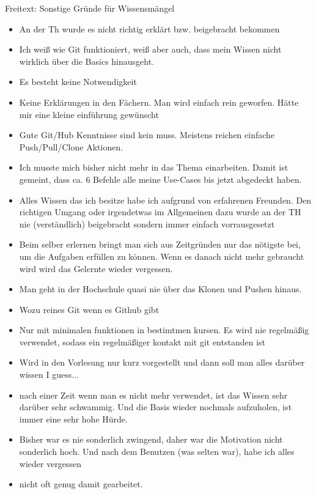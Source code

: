\documentclass[
	ngerman,
	BCOR=8mm,
	headings=normal,
	parskip=half,
	headsepline,
	automark,
	listof=totoc,
	bibliography=totoc,
]{scrreprt}
\begin{document}
Freitext: Sonstige Gründe für Wissensmängel
\begin{itemize}
    \setlength{\itemsep}{-1pt} 
    \item An der Th wurde es nicht richtig erklärt bzw. beigebracht bekommen
    \item Ich weiß wie Git funktioniert, weiß aber auch, dass mein Wissen nicht wirklich über die Basics hinausgeht.
    \item Es besteht keine Notwendigkeit
    \item Keine Erklärungen in den Fächern. Man wird einfach rein geworfen. Hätte mir eine kleine einführung gewünscht
    \item Gute Git/Hub Kenntnisse sind kein muss. Meistens reichen einfache Push/Pull/Clone Aktionen.
    \item Ich musste mich bisher nicht mehr in das Thema einarbeiten. Damit ist gemeint, dass ca. 6 Befehle alle meine Use-Cases bis jetzt abgedeckt haben.
    \item Alles Wissen das ich besitze habe ich aufgrund von erfahrenen Freunden. Den richtigen Umgang oder irgendetwas im Allgemeinen dazu wurde an der TH nie (verständlich) beigebracht sondern immer einfach vorrausgesetzt
    \item Beim selber erlernen bringt man sich aus Zeitgründen nur das nötigste bei, um die Aufgaben erfüllen zu können. Wenn es danach nicht mehr gebraucht wird wird das Gelernte wieder vergessen.
    \item Man geht in der Hochschule quasi nie über das Klonen und Pushen hinaus.
    \item Wozu reines Git wenn es Github gibt
    \item Nur mit minimalen funktionen in bestimtmen kursen. Es wird nie regelmäßig verwendet, sodass ein regelmäßiger kontakt mit git entstanden ist
    \item Wird in den Vorlesung nur kurz vorgestellt und dann soll man alles darüber wissen I guess...
    \item nach einer Zeit wenn man es nicht mehr verwendet, ist das Wissen sehr darüber sehr schwammig. Und die Basis wieder nochmals aufzuholen, ist immer eine sehr hohe Hürde.
    \item Bisher war es nie sonderlich zwingend, daher war die Motivation nicht sonderlich hoch. Und nach dem Benutzen (was selten war), habe ich alles wieder vergessen
    \item nicht oft genug damit gearbeitet.
\end{itemize}
\end{document}
